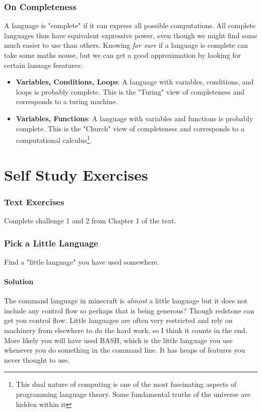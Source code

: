 \documentclass[twoside=false, DIV=14]{scrartcl}
\begin{document}
\section*{On Completeness}
A language is "complete" if it can express all possible computations.  All complete languages thus have equivalent expressive power, even though we might find some much easier to use than others.  Knowing \emph{for sure} if a language is complete can take some maths nouse, but we can get a good approximation by looking for certain lanuage feeatures:
\begin{itemize}
  \item \textbf{Variables, Conditions, Loops}: A language with variables, conditions, and loops is probably complete.  This is the "Turing" view of completeness and corresponds to a turing machine.
  \item \textbf{Variables, Functions}: A language with variables and functions is probably complete.  This is the "Church" view of completeness and corresponds to a computational calculus\footnote{This dual nature of computing is one of the most fascinating aspects of programming language theory.  Some fundamental truths of the universe are hidden within it}.
\end{itemize}

\newpage
\part*{Self Study Exercises}
\section*{Text Exercises}
Complete challenge 1 and 2 from  Chapter 1 of the text.

\section*{Pick a Little Language}
Find a "little language" you have used somewhere.

\subsection*{Solution}
  The command language in minecraft is \emph{almost} a little language but it does not include any control flow so perhaps that is being generous?  Though redstone can get you control flow.  Little languages are often very restricted and rely on machinery from elsewhere to do the hard work, so I think it counts in the end.  More likely you will have used BASH, which is the little language you use whenever you do something in the command line.  It has heaps of features you never thought to use.
\end{document}
